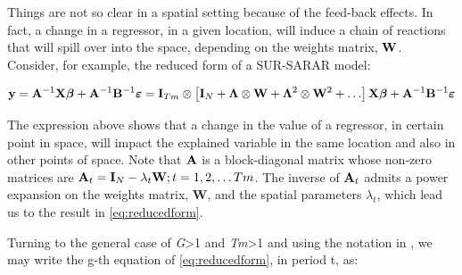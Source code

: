\documentclass[article]{jss}
\begin{document}
Things are not so clear in a spatial setting because of the feed-back effects. In fact, a change in a regressor, in a given location, will induce a chain of reactions that will spill over into the space, depending on the weights matrix, \(\bf W\). Consider, for example, the reduced form of a SUR-SARAR model:

\begin{equation}
{\bf y}={\bf A}^{-1}{\bf X}{\boldsymbol \beta}+{\bf A}^{-1}{\bf B}^{-1}{\boldsymbol \varepsilon}={\bf I}_{Tm}\otimes\left[{\bf I}_{N}+{\boldsymbol \Lambda} \otimes {\bf W}+{\boldsymbol \Lambda}^{2}\otimes {\bf W}^{2}+\ldots \right] {\bf X} {\boldsymbol \beta}+{\bf A}^{-1}{\bf B}^{-1}{\boldsymbol \varepsilon}
\label{eq:reducedform}
\end{equation}

The expression above shows that a change in the value of a regressor, in certain point in space, will impact the explained variable in the same location and also in other points of space. Note that \({\bf A}\) is a block-diagonal matrix whose non-zero matrices are \({\bf A}_{t}={\bf I}_{N}-\lambda_{t}\textbf{W}; t=1,2, \ldots Tm\). The inverse of \({\bf A}_{t}\) admits a power expansion on the weights matrix, \textbf{W}, and the spatial parameters \(\lambda_{t}\), which lead us to the result in \eqref{eq:reducedform}.

Turning to the general case of \emph{G}\textgreater{}1 and \emph{Tm}\textgreater{}1 and using the notation in \citet{LeSage2009}, we may write the g-th equation of \eqref{eq:reducedform}, in period t, as:
\end{document}
